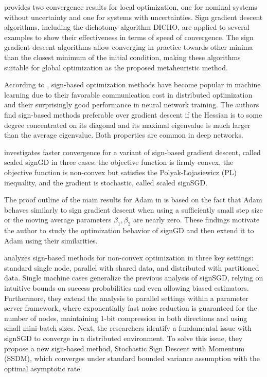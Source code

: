 \documentclass[11pt]{book}
\begin{document}
\cite{moulay2019properties} provides two convergence results for
local optimization, one for nominal systems without uncertainty and
one for systems with uncertainties. Sign gradient descent algorithms,
including the dichotomy algorithm DICHO, are applied to several examples
to show their effectiveness in terms of speed of convergence. The
sign gradient descent algorithms allow converging in practice
towards other minima than the closest minimum of the initial condition,
making these algorithms suitable for global optimization as the proposed
metaheuristic method.

According to \cite{balles2020geometry}, sign-based optimization methods
have become popular in machine learning due to their favorable communication
cost in distributed optimization and their surprisingly good performance
in neural network training. The authors find sign-based methods preferable
over gradient descent if the Hessian is to some degree concentrated
on its diagonal and its maximal eigenvalue is much larger than the
average eigenvalue. Both properties are common in deep networks.

\cite{li2021faster} investigates faster convergence for a variant
of sign-based gradient descent, called scaled signGD in three cases:
the objective function is firmly convex, the objective function is
non-convex but satisfies the Polyak-Łojasiewicz (PL) inequality, and
the gradient is stochastic, called scaled signSGD.

The proof outline of the main results for Adam in \cite{zou2021understanding}
is based on the fact that Adam behaves similarly to sign gradient
descent when using a sufficiently small step size or the moving average
parameters $\beta_{1},\beta_{2}$ are nearly zero. These findings motivate the
author to study the optimization behavior of signGD and then extend
it to Adam using their similarities.

\cite{safaryan2021stochastic} analyzes sign-based methods for non-convex
optimization in three key settings: standard single node, parallel
with shared data, and distributed with partitioned data. Single machine
cases generalize the previous analysis of signSGD, relying on intuitive
bounds on success probabilities and even allowing biased estimators.
Furthermore, they extend the analysis to parallel settings within
a parameter server framework, where exponentially fast noise reduction
is guaranteed for the number of nodes, maintaining 1-bit compression
in both directions and using small mini-batch sizes. Next, the researchers identify
a fundamental issue with signSGD to converge in a distributed environment.
To solve this issue, they propose a new sign-based method, Stochastic
Sign Descent with Momentum (SSDM), which converges under standard
bounded variance assumption with the optimal asymptotic rate.
\end{document}

